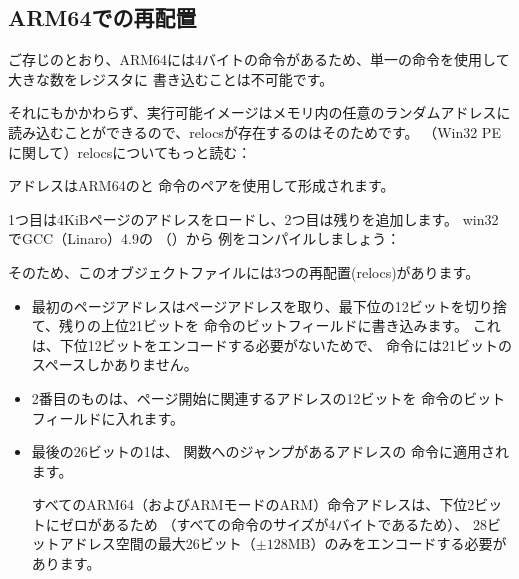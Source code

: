 ﻿\newcommand{\ARMELF}{\InSqBrackets{\emph{ELF for the ARM 64-bit Architecture (AArch64)}, (2013)}\footnote{\AlsoAvailableAs \url{http://infocenter.arm.com/help/topic/com.arm.doc.ihi0056b/IHI0056B_aaelf64.pdf}}}

\subsection{ARM64での再配置}
\label{ARM64_relocs}

ご存じのとおり、ARM64には4バイトの命令があるため、単一の命令を使用して大きな数をレジスタに
書き込むことは不可能です。

それにもかかわらず、実行可能イメージはメモリ内の任意のランダムアドレスに読み込むことができるので、relocsが存在するのはそのためです。
（Win32 PEに関して）relocsについてもっと読む：


アドレスはARM64のと \ADD 命令のペアを使用して形成されます。

1つ目は4KiBページのアドレスをロードし、2つ目は残りを追加します。
win32でGCC（Linaro）4.9の \q{\HelloWorldSectionName}（）から
例をコンパイルしましょう：



そのため、このオブジェクトファイルには3つの再配置(relocs)があります。

\begin{itemize}
\item 
最初のページアドレスはページアドレスを取り、最下位の12ビットを切り捨て、残りの上位21ビットを
命令のビットフィールドに書き込みます。 これは、下位12ビットをエンコードする必要がないためで、
命令には21ビットのスペースしかありません。

\item 
2番目のものは、ページ開始に関連するアドレスの12ビットを \ADD 命令のビットフィールドに入れます。

\item 
最後の26ビットの1は、 \printf 関数へのジャンプがあるアドレスの
命令に適用されます。

すべてのARM64（およびARMモードのARM）命令アドレスは、下位2ビットにゼロがあるため
（すべての命令のサイズが4バイトであるため）、
28ビットアドレス空間の最大26ビット（$\pm 128$MB）のみをエンコードする必要があります。 

\end{itemize}

